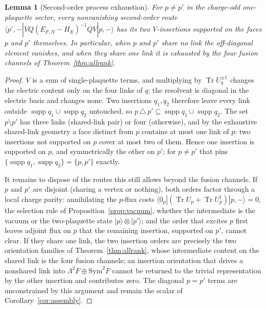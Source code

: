 \documentclass[11pt]{article}
\theoremstyle{plain}
\newtheorem{lemma}[theorem]{Lemma}
\theoremstyle{definition}
\theoremstyle{remark}
\newcommand{\chk}[1]{}
\newcommand{\dg}{^{\dagger}}
\begin{document}
\chk{the torus graph is simple, and the only short cycles are the L = 3 winding triangles}
\chk{every 4-cycle is an elementary face, except exactly the 3L\^{}2 straight winding loops at L = 4}

\begin{lemma}[Second-order process exhaustion]\label{lem:exhaust}
For $p\ne p'$ in the charge-odd one-plaquette sector, every nonvanishing
second-order route $\langle p',-|VQ(E_{F,N}-H_E)^{-1}QV|p,-\rangle$ has its
two $V$-insertions supported on the faces $p$ and $p'$ themselves. In
particular, when $p$ and $p'$ share no link the off-diagonal element
vanishes, and when they share one link it is exhausted by the four fusion
channels of Theorem~\ref{thm:allrank}.
\end{lemma}

\begin{proof}
$V$ is a sum of single-plaquette terms, and multiplying by
$\operatorname{Tr}U_q^{\pm1}$ changes the electric content only on the four
links of $q$; the resolvent is diagonal in the electric basis and changes
none. Two insertions $q_1,q_2$ therefore leave every link outside
$\operatorname{supp}q_1\cup\operatorname{supp}q_2$ untouched, so
$p\,\triangle\,p'\subseteq\operatorname{supp}q_1\cup\operatorname{supp}q_2$.
The set $p\setminus p'$ has three links (shared-link pair) or four
(otherwise), and by the exhaustive shared-link geometry a face distinct from
$p$ contains at most one link of $p$: two insertions not supported on $p$
cover at most two of them. Hence one insertion is supported on $p$, and
symmetrically the other on $p'$; for $p\ne p'$ that pins
$\{\operatorname{supp}q_1,\operatorname{supp}q_2\}=\{p,p'\}$ exactly.

It remains to dispose of the routes this still allows beyond the fusion
channels. If $p$ and $p'$ are disjoint (sharing a vertex or nothing), both
orders factor through a local charge parity: annihilating the $p$-flux costs
$\langle0_p|(\operatorname{Tr}U_p+\operatorname{Tr}U_p\dg)|p,-\rangle=0$,
the selection rule of Proposition~\ref{prop:vacuum}, whether the intermediate
is the vacuum or the two-plaquette state $|p\rangle\otimes|p'\rangle$; and
the order that excites $p$ first leaves adjoint flux on $p$ that the
remaining insertion, supported on $p'$, cannot clear. If they share one
link, the two insertion orders are precisely the two orientation families
of Theorem~\ref{thm:allrank}, whose intermediate content on the shared link
is the four fusion channels; an insertion orientation that drives a
nonshared link into $\Lambda^2F\oplus\mathrm{Sym}^2F$ cannot be returned to
the trivial representation by the other insertion and contributes zero. The
diagonal $p=p'$ terms are unconstrained by this argument and remain the
scalar of Corollary~\ref{cor:assembly}.
\end{proof}
\chk{the plaquette graph is 12-regular and two faces share at most one link}
\end{document}
